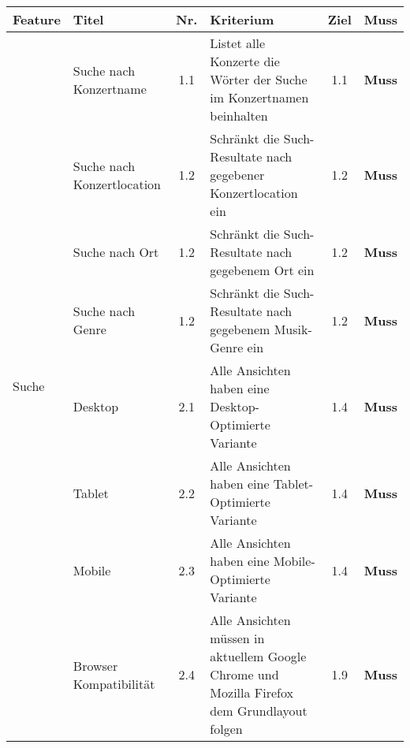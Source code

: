 \begin{longtable}[]{@{}p{1.9cm}p{2.5cm}cp{5.5cm}cc@{}}
  \toprule
  \textbf{Feature}           & \textbf{Titel}             & \textbf{Nr.} & \textbf{Kriterium}                                                                                          & \textbf{Ziel} & \textbf{Muss}\tabularnewline
  \midrule
  \endhead
  \multirow{10}{*}{Suche}    & Suche nach Konzertname     & 1.1          & Listet alle Konzerte die Wörter der Suche im Konzertnamen beinhalten                                        & 1.1           & \textbf{Muss}                \\ \cline{2-6}
                             & Suche nach Konzertlocation & 1.2          & Schränkt die Such-Resultate nach gegebener Konzertlocation ein                                              & 1.2           & \textbf{Muss}                \\ \cline{2-6}
                             & Suche nach Ort             & 1.2          & Schränkt die Such-Resultate nach gegebenem Ort ein                                                          & 1.2           & \textbf{Muss}                \\ \cline{2-6}
                             & Suche nach Genre           & 1.2          & Schränkt die Such-Resultate nach gegebenem Musik-Genre ein                                                  & 1.2           & \textbf{Muss}                \\
  \midrule
  \multirow{8}{*}{Design}    & Desktop                    & 2.1          & Alle Ansichten haben eine Desktop-Optimierte Variante                                                       & 1.4           & \textbf{Muss}                \\ \cline{2-6}
                             & Tablet                     & 2.2          & Alle Ansichten haben eine Tablet-Optimierte Variante                                                        & 1.4           & \textbf{Muss}                \\ \cline{2-6}
                             & Mobile                     & 2.3          & Alle Ansichten haben eine Mobile-Optimierte Variante                                                        & 1.4           & \textbf{Muss}                \\ \cline{2-6}
                             & Browser Kompatibilität     & 2.4          & Alle Ansichten müssen in aktuellem Google Chrome und Mozilla Firefox dem Grundlayout folgen                 & 1.9           & \textbf{Muss}                \\

\end{longtable}
